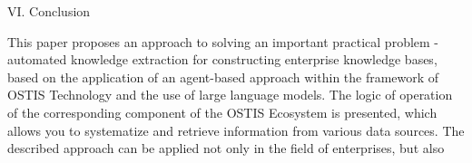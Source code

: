 \documentclass[11pt,final]{article}
\begin{document}
\begin{multicols}{2}
            \vspace{0.2em}

        \begin{center}
            VI. Conclusion
        \end{center}
        This paper proposes an approach to solving an important practical problem - automated knowledge extraction
        for constructing enterprise knowledge bases, based on the
        application of an agent-based approach within the framework of OSTIS Technology and the use of large language
        models. The logic of operation of the corresponding
        component of the OSTIS Ecosystem is presented, which
        allows you to systematize and retrieve information from
        various data sources. The described approach can be
        applied not only in the field of enterprises, but also
    \end{multicols}
    
    \newpage
    
\end{document}
